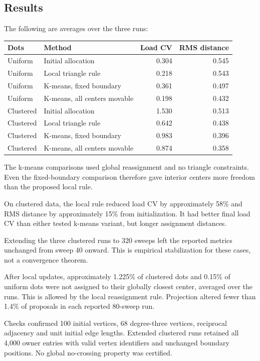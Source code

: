\documentclass[11pt]{article}
\begin{document}
\subsection{Results}
The following are averages over the three runs:
\begin{center}
\begin{tabular}{llrr}
\toprule
Dots & Method & Load CV & RMS distance\\
\midrule
Uniform & Initial allocation & 0.304 & 0.545\\
Uniform & Local triangle rule & 0.218 & 0.543\\
Uniform & K-means, fixed boundary & 0.361 & 0.497\\
Uniform & K-means, all centers movable & 0.198 & 0.432\\
\midrule
Clustered & Initial allocation & 1.530 & 0.513\\
Clustered & Local triangle rule & 0.642 & 0.438\\
Clustered & K-means, fixed boundary & 0.983 & 0.396\\
Clustered & K-means, all centers movable & 0.874 & 0.358\\
\bottomrule
\end{tabular}
\end{center}
The k-means comparisons used global reassignment and no triangle constraints. Even the fixed-boundary comparison therefore gave interior centers more freedom than the proposed local rule.

On clustered data, the local rule reduced load CV by approximately 58\% and RMS distance by approximately 15\% from initialization. It had better final load CV than either tested k-means variant, but longer assignment distances.

Extending the three clustered runs to 320 sweeps left the reported metrics unchanged from sweep 40 onward. This is empirical stabilization for these cases, not a convergence theorem.

After local updates, approximately 1.225\% of clustered dots and 0.15\% of uniform dots were not assigned to their globally closest center, averaged over the runs. This is allowed by the local reassignment rule. Projection altered fewer than 1.4\% of proposals in each reported 80-sweep run.

Checks confirmed 100 initial vertices, 68 degree-three vertices, reciprocal adjacency and unit initial edge lengths. Extended clustered runs retained all 4,000 owner entries with valid vertex identifiers and unchanged boundary positions. No global no-crossing property was certified.
\end{document}
